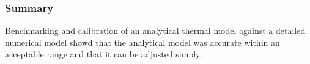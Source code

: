 

\begin{frame}[ctb!]
  \frametitle{Summary}
  Benchmarking and calibration of an analytical thermal model against a detailed 
  numerical model showd that the analytical model was accurate within an 
  acceptable range and that it can be adjusted simply. 
\end{frame}

